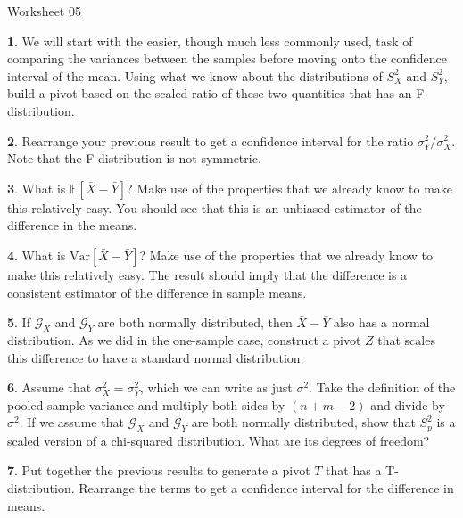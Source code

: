\documentclass{tufte-handout}
\begin{document}
\justify

{\LARGE Worksheet 05}

\vspace*{18pt}


\textbf{1}. We will start with the easier, though much less commonly used, task of
comparing the variances between the samples before moving onto the confidence
interval of the mean. Using what we know about the distributions of $S_X^2$ and
$S_Y^2$, build a pivot based on the scaled ratio of these two quantities that
has an F-distribution.

\textbf{2}. Rearrange your previous result to get a confidence interval for the ratio
$\sigma_Y^2 / \sigma_X^2$. Note that the F distribution is not symmetric.

\textbf{3}. What is $\mathbb{E}[\bar{X} - \bar{Y}]$? Make use of the properties that we
already know to make this relatively easy. You should see that this is an
unbiased estimator of the difference in the means.

\textbf{4}. What is $\text{Var}[\bar{X} - \bar{Y}]$? Make use of the properties that we
already know to make this relatively easy. The result should imply that the
difference is a consistent estimator of the difference in sample means.

\textbf{5}. If $\mathcal{G}_X$ and $\mathcal{G}_Y$ are both normally distributed, then
$\bar{X} - \bar{Y}$ also has a normal distribution. As we did in the one-sample
case, construct a pivot $Z$ that scales this difference to have a standard 
normal distribution.

\textbf{6}. Assume that $\sigma_X^2 = \sigma_Y^2$, which we can write as just $\sigma^2$.
Take the definition of the pooled sample variance and multiply both sides by
$(n + m - 2)$ and divide by $\sigma^2$. If we assume that $\mathcal{G}_X$ and
$\mathcal{G}_Y$ are both normally distributed, show that $S_p^2$ is a scaled
version of a chi-squared distribution. What are its degrees of freedom?

\textbf{7}. Put together the previous results to generate a pivot $T$ that has a T-distribution.
Rearrange the terms to get a confidence interval for the difference in means.
\end{document}
